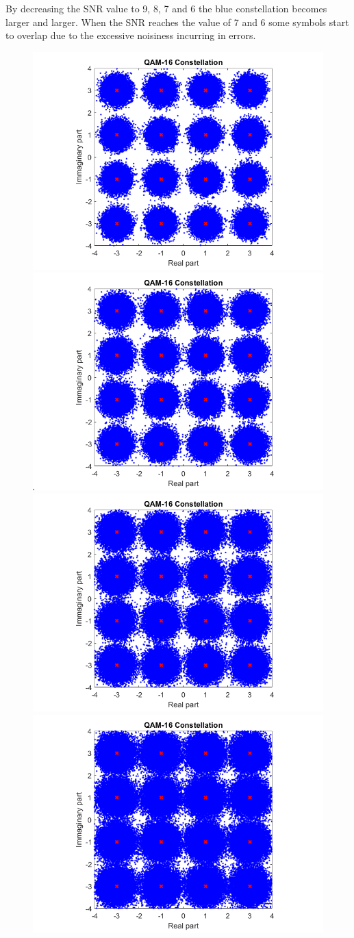 \FloatBarrier\noindent By decreasing the SNR value to 9, 8, 7 and 6 the blue constellation becomes larger and larger. When the SNR reaches the value of 7 and 6 some symbols start to overlap due to the excessive noisiness incurring in errors.

\begin{figure}[!h]
    \centering
    \includegraphics[width = .49\textwidth]{lab-6/imgs/SNR9.png}
    \includegraphics[width = .49\textwidth]{lab-6/imgs/SNR8.png}
    \\
    \includegraphics[width = .49\textwidth]{lab-6/imgs/SNR7.png}
    \includegraphics[width = .49\textwidth]{lab-6/imgs/SNR6.png}
\end{figure}
\vspace{-10px}

